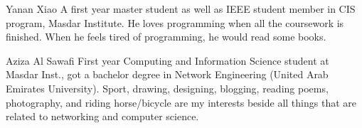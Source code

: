 \documentclass[journal]{IEEEtran}
\begin{document}


%

%




%


\begin{IEEEbiographynophoto}{Yanan Xiao}
A first year master student as well as IEEE student member in CIS program, Masdar Institute. He loves programming when all the coursework is finished. When he feels tired of programming, he would read some books.
\end{IEEEbiographynophoto}


\begin{IEEEbiographynophoto}{Aziza Al Sawafi}
 First year Computing and Information Science student at Masdar Inst., got a bachelor degree in Network Engineering (United Arab Emirates University). Sport, drawing, designing, blogging, reading poems, photography, and riding horse/bicycle are my interests beside all things that are related to networking and computer science.
\end{IEEEbiographynophoto}
\end{document}
